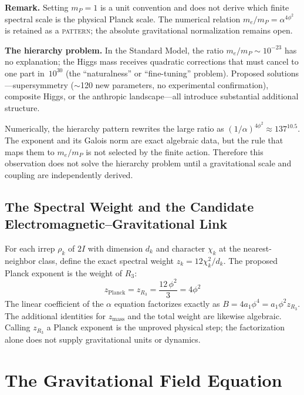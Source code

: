 \documentclass[12pt,a4paper]{article}
\theoremstyle{definition}
\begin{document}
\textbf{Remark.}  Setting $m_P=1$ is a unit convention and does not derive which finite spectral scale is the physical Planck scale.  The numerical relation $m_e/m_P=\alpha^{4\phi^2}$ is retained as a \textsc{pattern}; the absolute gravitational normalization remains open.

\textbf{The hierarchy problem.}  In the Standard Model, the ratio $m_e/m_P \sim 10^{-23}$ has no explanation; the Higgs mass receives quadratic corrections that must cancel to one part in~$10^{30}$ (the ``naturalness'' or ``fine-tuning'' problem).  Proposed solutions---supersymmetry ($\sim$120 new parameters, no experimental confirmation), composite Higgs, or the anthropic landscape---all introduce substantial additional structure.

Numerically, the hierarchy pattern rewrites the large ratio as
$(1/\alpha)^{4\phi^2}\approx137^{10.5}$.  The exponent and its Galois norm are
exact algebraic data, but the rule that maps them to $m_e/m_P$ is not selected
by the finite action.  Therefore this observation does not solve the hierarchy
problem until a gravitational scale and coupling are independently derived.

\subsection{The Spectral Weight and the Candidate Electromagnetic--Gravitational Link}
\label{sec:spectral_weight}

For each irrep $\rho_k$ of $2I$ with dimension $d_k$ and character $\chi_k$ at the nearest-neighbor class, define the exact spectral weight $z_k=12\chi_k^2/d_k$.  The proposed Planck exponent is the weight of $R_3$:
\begin{equation}
\boxed{z_{\text{Planck}} = z_{R_3} = \frac{12\,\phi^2}{3} = 4\phi^2}
\label{eq:zP_spectral}
\end{equation}
The linear coefficient of the $\alpha$ equation factorizes exactly as
$B=4a_1\phi^4=a_1\phi^2z_{R_3}$.  The additional identities for
$z_{\mathrm{mass}}$ and the total weight are likewise algebraic.  Calling
$z_{R_3}$ a Planck exponent is the unproved physical step; the factorization
alone does not supply gravitational units or dynamics.


\section{The Gravitational Field Equation}
\label{sec:gravity}
\end{document}
